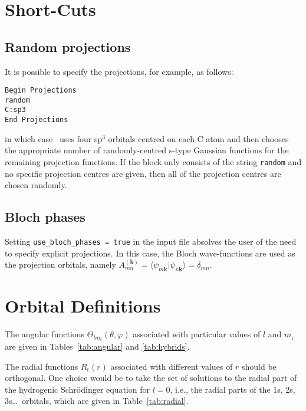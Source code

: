\section{Short-Cuts}

\subsection{Random projections}

It is possible to specify the projections, for example, as follows:

\noindent
\verb#Begin Projections#\\
\verb#random#\\
\verb#C:sp3#\\
\verb#End Projections#

in which case \wannier\ uses four sp$^3$ orbitals centred on each C
atom and then chooses the appropriate number of randomly-centred
s-type Gaussian functions for the remaining projection functions. If
the block only consists of the string {\tt random} and no specific
projection centres are given, then all of the projection centres are
chosen randomly.


\subsection{Bloch phases}

Setting \verb#use_bloch_phases = true# in the input file absolves the
user of the need to specify explicit projections. In this case, the
Bloch wave-functions are used as the projection orbitals, namely
$A_{mn}^{(\mathbf{k})} =
\langle\psi_{m\mathbf{k}}|\psi_{n\mathbf{k}}\rangle = \delta_{mn}$.


\section{Orbital Definitions} \label{sec:orbital-defs}

The angular functions $\Theta_{lm_{\mathrm{r}}}(\theta,\varphi)$
associated with particular values of $l$ and $m_{\mathrm{r}}$ are given
in Tables~\ref{tab:angular} and \ref{tab:hybrids}. 

The radial functions $R_{\mathrm{r}}(r)$ associated with different values of
$r$ should be orthogonal. One choice would be to take the set of
solutions to the radial part of the hydrogenic Schr\"{o}dinger
equation for $l=0$, i.e., the radial parts of the 1s,
2s, 3s\ldots\ orbitals, which are given in Table~\ref{tab:radial}. 


